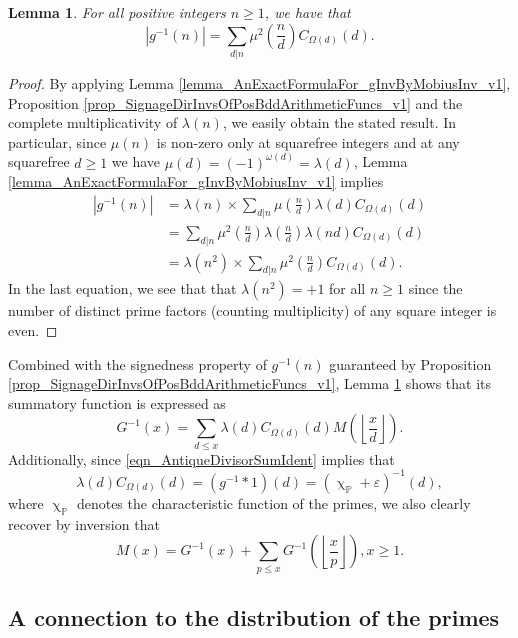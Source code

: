 \documentclass[11pt,reqno,a4letter]{article}
\numberwithin{figure}{section}
\numberwithin{table}{section}
\renewcommand{\chi}{\upchi}
\newcommand{\Floor}[2]{\ensuremath{\left\lfloor \frac{#1}{#2} \right\rfloor}}
\theoremstyle{plain}
\newtheorem{lemma}[theorem]{Lemma}
\numberwithin{theorem}{section}
\theoremstyle{definition}
\begin{document}
\begin{lemma} 
\label{lemma_AbsValueOf_gInvn_FornSquareFree_v1} 
For all positive integers $n \geq 1$, we have that 
\begin{equation} 
\label{eqn_AbsValueOf_gInvn_FornSquareFree_v1} 
|g^{-1}(n)| = \sum_{d|n} \mu^2\left(\frac{n}{d}\right) C_{\Omega(d)}(d). 
\end{equation} 
\end{lemma} 
\begin{proof} 
By applying 
Lemma \ref{lemma_AnExactFormulaFor_gInvByMobiusInv_v1}, 
Proposition \ref{prop_SignageDirInvsOfPosBddArithmeticFuncs_v1} and the 
complete multiplicativity of $\lambda(n)$, 
we easily obtain the stated result. 
In particular, since $\mu(n)$ is non-zero only at squarefree integers and 
at any squarefree $d \geq 1$ we have $\mu(d) = (-1)^{\omega(d)} = \lambda(d)$, 
Lemma \ref{lemma_AnExactFormulaFor_gInvByMobiusInv_v1} implies 
\begin{align*} 
|g^{-1}(n)| & = \lambda(n) \times \sum_{d|n} \mu\left(\frac{n}{d}\right) \lambda(d) C_{\Omega(d)}(d) \\ 
     & = \sum_{d|n} \mu^2\left(\frac{n}{d}\right) \lambda\left(\frac{n}{d}\right) 
     \lambda(nd) C_{\Omega(d)}(d) \\ 
     & = \lambda(n^2) \times \sum_{d|n} \mu^2\left(\frac{n}{d}\right) C_{\Omega(d)}(d). 
\end{align*} 
In the last equation, we see that 
that $\lambda(n^2) = +1$ for all $n \geq 1$ since the number of distinct 
prime factors (counting multiplicity) of any square integer is even. 
\end{proof} 

Combined with the signedness property of $g^{-1}(n)$ guaranteed by 
Proposition \ref{prop_SignageDirInvsOfPosBddArithmeticFuncs_v1}, 
Lemma \ref{lemma_AbsValueOf_gInvn_FornSquareFree_v1} shows that its summatory 
function is expressed as 
\[
G^{-1}(x) = \sum_{d \leq x} \lambda(d) C_{\Omega(d)}(d) M\left(\Floor{x}{d}\right). 
\]
Additionally, since \eqref{eqn_AntiqueDivisorSumIdent} implies that 
$$\lambda(d) C_{\Omega(d)}(d) = (g^{-1} \ast 1)(d) = (\chi_{\mathbb{P}} + \varepsilon)^{-1}(d),$$ 
where $\chi_{\mathbb{P}}$ denotes the characteristic function of the primes, we also clearly 
recover by inversion that 
\[
M(x) = G^{-1}(x) + \sum_{p \leq x} G^{-1}\left(\Floor{x}{p}\right), x \geq 1. 
\]

\subsection{A connection to the distribution of the primes} 
\end{document}
